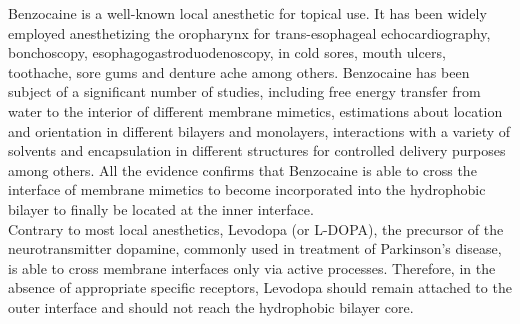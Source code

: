 \documentclass[3p,preprint,review]{elsarticle}
\begin{document}
	
	Benzocaine is a well-known local anesthetic for topical use. It has been widely
	employed anesthetizing the oropharynx for trans-esophageal echocardiography,
	bonchoscopy, esophagogastroduodenoscopy, in cold sores, mouth ulcers,
	toothache,
	sore gums and denture ache among others\cite{McEvoy2007}.
	Benzocaine has been subject of a significant number of studies, including free
	energy transfer from water to the interior of different membrane
	mimetics\cite{Martin2014a,Cascales2011,Porasso2009,J.J.LopezCascales2006},
	estimations about location and orientation in different bilayers and
	monolayers\cite{Matsuki2001,Suwalsky2004,Kuroda2000,Choi2001}, interactions
	with
	a variety of
	solvents\cite{Cardenas2016,Cardenas2018,Paluch2015,Avila2002,Aguado2013} and
	encapsulation in different structures for controlled delivery
	purposes\cite{Shkurenko2018,AttouiYahia2017,Li2016,Arantes2014,Puglia2011}
	among
	others. All the evidence confirms that Benzocaine is able to cross the
	interface
	of membrane mimetics to become incorporated into the
	hydrophobic bilayer to finally be located at the inner interface.\\
	Contrary to most local anesthetics, Levodopa (or L-DOPA), the precursor of the
	neurotransmitter dopamine, commonly used in treatment of Parkinson's
	disease\cite{Fabbrini1987},
	is
	able to cross membrane interfaces only via active
	processes\cite{BENTLEY2012349,PRYOR2013180}.
	Therefore, in the absence of appropriate specific receptors, Levodopa should
	remain attached to the outer interface and should not reach the hydrophobic
	bilayer core\cite{Orowski2012}.\\
	
\end{document}
